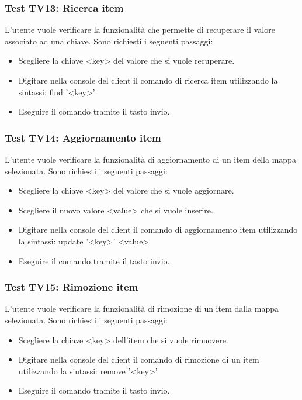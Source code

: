 \documentclass[a4paper]{article}
\begin{document}
		\subsubsection{Test TV13: Ricerca item}
		L'utente vuole verificare la funzionalità che permette di recuperare il valore associato ad una chiave.
		Sono richiesti i seguenti passaggi:
		\begin{itemize}
			\item Scegliere la chiave <key> del valore che si vuole recuperare.
			\item Digitare nella console del client il comando di ricerca item utilizzando la sintassi: find '<key>'
			\item Eseguire il comando tramite il tasto invio.	
		\end{itemize}
		
		\subsubsection{Test TV14: Aggiornamento item}
		L'utente vuole verificare la funzionalità di aggiornamento di un item della mappa selezionata.
		Sono richiesti i seguenti passaggi:
		\begin{itemize}
			\item Scegliere la chiave <key> del valore che si vuole aggiornare.
			\item Scegliere il nuovo valore <value> che si vuole inserire.
			\item Digitare nella console del client il comando di aggiornamento item utilizzando la sintassi: update '<key>' <value>
			\item Eseguire il comando tramite il tasto invio.
		\end{itemize}
		
		\subsubsection{Test TV15: Rimozione item}
		L'utente vuole verificare la funzionalità di rimozione di un item dalla mappa selezionata.
		Sono richiesti i seguenti passaggi:
		\begin{itemize}
			\item Scegliere la chiave <key> dell'item che si vuole rimuovere.
			\item Digitare nella console del client il comando di rimozione di un item utilizzando la sintassi: remove '<key>'
			\item Eseguire il comando tramite il tasto invio.
		\end{itemize}
		
\end{document}

